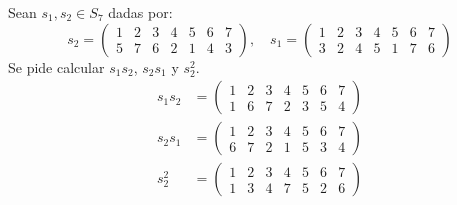 \begin{ejemplo}
    Sean $s_1,s_2\in S_7$ dadas por:
    \begin{equation*}
        s_2 = \left(\begin{array}{ccccccc}
                1 & 2 & 3 & 4 & 5 & 6 & 7 \\
                5 & 7 & 6 & 2 & 1 & 4 & 3
        \end{array}\right), \quad s_1 = \left(\begin{array}{ccccccc}
                1 & 2 & 3 & 4 & 5 & 6 & 7 \\
                3 & 2 & 4 & 5 & 1 & 7 & 6
        \end{array}\right)
    \end{equation*}
    Se pide calcular $s_1s_2$, $s_2s_1$ y $s_2^2$.
    \begin{align*}
        s_1s_2 &= \left(\begin{array}{ccccccc}
                1 & 2 & 3 & 4 & 5 & 6 & 7 \\
                1 & 6 & 7 & 2 & 3 & 5 & 4
        \end{array}\right) \\
        s_2s_1 &= \left(\begin{array}{ccccccc}
                1 & 2 & 3 & 4 & 5 & 6 & 7 \\
                6 & 7 & 2 & 1 & 5 & 3 & 4
        \end{array}\right) \\
        s_2^2 &= \left(\begin{array}{ccccccc}
                1 & 2 & 3 & 4 & 5 & 6 & 7 \\
                1 & 3 & 4 & 7 & 5 & 2 & 6
        \end{array}\right)
    \end{align*}
\end{ejemplo}

